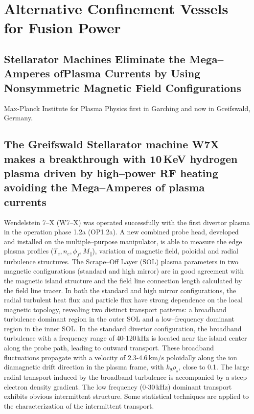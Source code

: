 \documentclass[a4paper,openany,12pt]{report}
\begin{document}
\chapter{Alternative Confinement Vessels for Fusion Power}

\section{Stellarator Machines Eliminate the Mega--Amperes of\hfill\break Plasma Currents by Using Nonsymmetric Magnetic Field Configurations}

Max-Planck Institute for Plasma Physics first in Garching and now in Greifswald, Germany.

\section{The Greifswald Stellarator machine W7X makes a breakthrough with $\textbf{10}\,$KeV hydrogen plasma driven by high--power RF heating avoiding the Mega--Amperes of plasma currents}

Wendelstein 7--X (W7--X) was operated successfully with the first divertor plasma in the operation phase 1.2a (OP1.2a). A new combined probe head, developed and installed on the multiple--purpose manipulator, is able to measure the edge plasma profiles ($T_e, n_e, \phi_f, M_\|$), variation of magnetic field, poloidal and radial turbulence structures. The Scrape--Off Layer (SOL) plasma parameters in two magnetic configurations (standard and high mirror) are in good agreement with the magnetic island structure and the field line connection length calculated by the field line tracer. In both the standard and high mirror configurations, the radial turbulent heat flux and particle flux have strong dependence on the local magnetic topology, revealing two distinct transport patterns: a broadband turbulence dominant region in the outer SOL and a low--frequency dominant region in the inner SOL. In the standard divertor configuration, the broadband turbulence with a frequency range of 40-120$\,$kHz is located near the island center along the probe path, leading to outward transport. These broadband fluctuations propagate with a velocity of 2.3-4.6$\,$km/s poloidally along the ion diamagnetic drift direction in the plasma frame, with $k_\theta\rho_s$, close to 0.1. The large radial transport induced by the broadband turbulence is accompanied by a steep electron density gradient. The low frequency (0-30$\,$kHz) dominant transport exhibits obvious intermittent structure. Some statistical techniques are applied to the characterization of the intermittent transport. 
\end{document}
